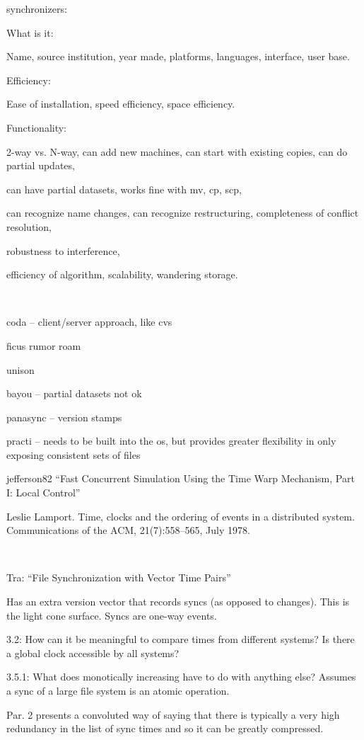 \documentclass{book}
\begin{document}
	synchronizers:

What is it:

Name, source institution, year made, platforms, languages, interface, user base.

Efficiency:

Ease of installation, speed efficiency, space efficiency.

Functionality:

2-way vs. N-way, can add new machines, can start with existing copies, can do partial updates,

can have partial datasets, works fine with mv, cp, scp,

can recognize name changes, can recognize restructuring, completeness of conflict resolution,

robustness to interference,

efficiency of algorithm, scalability, wandering storage.

~

coda -- client/server approach, like cvs

ficus rumor roam

unison

bayou -- partial datasets not ok

panasync -- version stamps

practi -- needs to be built into the os, but provides greater flexibility in only exposing consistent sets of files

jefferson82 ``Fast Concurrent Simulation Using the Time Warp Mechanism, Part I: Local Control''

Leslie Lamport. Time, clocks and the ordering of events in a distributed system. Communications of the ACM, 21(7):558–565, July 1978.

~

Tra: ``File Synchronization with Vector Time Pairs''

Has an extra version vector that records syncs (as opposed to changes).  This is the light cone surface.  Syncs are one-way events.

3.2: How can it be meaningful to compare times from different systems?  Is there a global clock accessible by all systems?

3.5.1: What does monotically increasing have to do with anything else?  Assumes a sync of a large file system is an atomic operation.

Par. 2 presents a convoluted way of saying that there is typically a very high redundancy in the list of sync times and so it can be greatly compressed.
\end{document}
